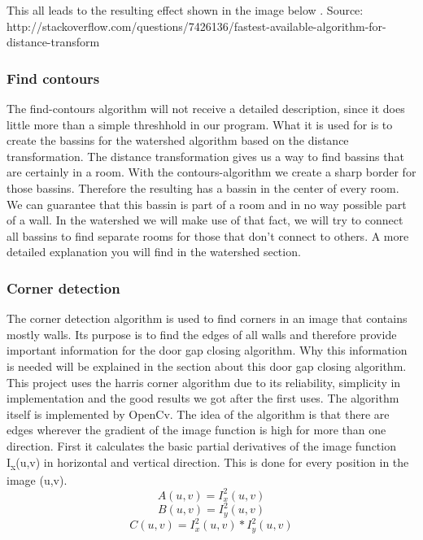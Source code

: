 This all leads to the resulting effect shown in the image below \citep[Section 3.3.3]{szeliski_2011}.
Source: http://stackoverflow.com/questions/7426136/fastest-available-algorithm-for-distance-transform

\subsubsection{Find contours}
The find-contours algorithm will not receive a detailed description, since it does little more than a simple threshhold in our program. What it is used for is to create the bassins for the watershed algorithm based on the distance transformation. The distance transformation gives us a way to find bassins that are certainly in a room. With the contours-algorithm we create a sharp border for those bassins. Therefore the resulting has a bassin in the center of every room. We can guarantee that this bassin is part of a room and in no way possible part of a wall. In the watershed we will make use of that fact, we will try to connect all bassins to find separate rooms for those that don't connect to others. A more detailed explanation you will find in the watershed section.

\subsubsection{Corner detection}
The corner detection algorithm is used to find corners in an image that contains mostly walls. Its purpose is to find the edges of all walls and therefore provide important information for the door gap closing algorithm. Why this information is needed will be explained in the section about this door gap closing algorithm.
This project uses the harris corner algorithm due to its reliability, simplicity in implementation and the good results we got after the first uses. The algorithm itself is implemented by OpenCv.
The idea of the algorithm is that there are edges wherever the gradient of the image function is high for more than one direction.
First it calculates the basic partial derivatives of the image function I\textsubscript{x}(u,v) in horizontal and vertical direction. This is done for every position in the image (u,v).
\[A(u,v) = I_{x}^2(u,v)\]
\[B(u,v) = I_{y}^2(u,v)\]
\[C(u,v) = I_{x}^2(u,v) * I_{y}^2(u,v)\]

